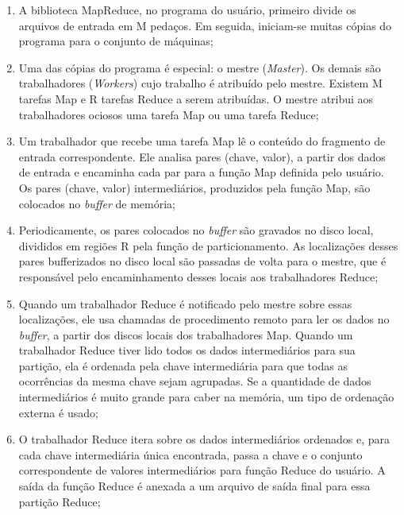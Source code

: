 \begin{enumerate}
\item A biblioteca MapReduce, no programa do usuário, primeiro divide os arquivos de entrada em M pedaços. Em seguida, iniciam-se muitas cópias do programa para o conjunto de máquinas;

\item Uma das cópias do programa é especial: o mestre (\textit{Master}). Os demais são trabalhadores (\textit{Workers}) cujo trabalho é atribuído pelo mestre. Existem M tarefas Map e R tarefas Reduce a serem atribuídas. O mestre atribui aos trabalhadores ociosos uma tarefa Map ou uma tarefa Reduce;

\item Um trabalhador que recebe uma tarefa Map lê o conteúdo do fragmento de entrada correspondente. Ele analisa pares (chave, valor), a partir dos dados de entrada e encaminha cada par para a função Map definida pelo usuário. Os pares (chave, valor) intermediários, produzidos pela função Map, são colocados no \textit{buffer} de memória;

\item Periodicamente, os pares colocados no \textit{buffer} são gravados no disco local, divididos em regiões R pela função de particionamento. As localizações desses pares bufferizados no disco local são passadas de volta para o mestre, que é responsável pelo encaminhamento desses locais aos trabalhadores Reduce;

\item Quando um trabalhador Reduce é notificado pelo mestre sobre essas localizações, ele usa chamadas de procedimento remoto para ler os dados no \textit{buffer}, a partir dos discos locais dos trabalhadores Map. Quando um trabalhador Reduce tiver lido todos os dados intermediários para sua partição, ela é ordenada pela chave intermediária para que todas as ocorrências da mesma chave sejam agrupadas. Se a quantidade de dados intermediários é muito grande para caber na memória, um tipo de ordenação externa é usado;

\item O trabalhador Reduce itera sobre os dados intermediários ordenados e, para cada chave intermediária única encontrada, passa a chave e o conjunto correspondente de valores intermediários para função Reduce do usuário. A saída da função Reduce é anexada a um arquivo de saída final para essa partição Reduce;

             	        	
\end{enumerate}


